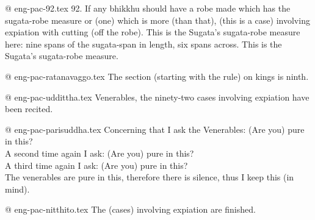 @ eng-pac-92.tex
92. If any bhikkhu should have a robe made which has the sugata-robe measure or (one) which is more (than that), (this is a case) involving expiation with cutting (off the robe). This is the Sugata's sugata-robe measure here: nine spans of the sugata-span in length, six spans across. This is the Sugata's sugata-robe measure.

@ eng-pac-ratanavaggo.tex
The section (starting with the rule) on kings is ninth.

@ eng-pac-uddittha.tex
Venerables, the ninety-two cases involving expiation have been recited.

@ eng-pac-parisuddha.tex
Concerning that I ask the Venerables: (Are you) pure in this?\\
A second time again I ask: (Are you) pure in this?\\
A third time again I ask: (Are you) pure in this?\\
The venerables are pure in this, therefore there is silence, thus I keep this (in mind).

@ eng-pac-nitthito.tex
The (cases) involving expiation are finished.
